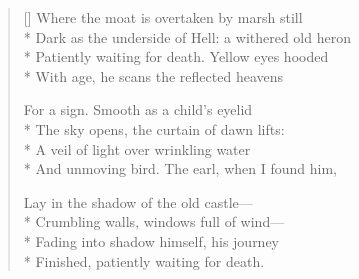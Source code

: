 \label{ch:lear_bp}
\settowidth{\versewidth}{Dark as the underside of Hell: a withered old heron}
\begin{verse}[\versewidth]
Where the moat is overtaken by marsh still\\*
Dark as the underside of Hell: a withered old heron\\*
Patiently waiting for death. Yellow eyes hooded\\*
With age, he scans the reflected heavens

For a sign. Smooth as a child's eyelid\\*
The sky opens, the curtain of dawn lifts:\\*
A veil of light over wrinkling water\\*
And unmoving bird. The earl, when I found him,

Lay in the shadow of the old castle---\\*
Crumbling walls, windows full of wind---\\*
Fading into shadow himself, his journey\\*
Finished, patiently waiting for death.
\end{verse}
